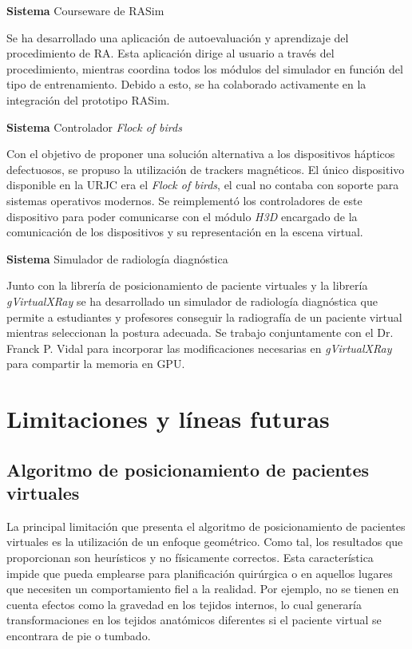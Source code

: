 \textbf{ Sistema } Courseware de \ac{RASim}

Se ha desarrollado una aplicación de autoevaluación y aprendizaje del procedimiento de \ac{RA}. Esta aplicación dirige al usuario a través del procedimiento, mientras coordina todos los módulos del simulador en función del tipo de entrenamiento. Debido a esto, se ha colaborado activamente en la integración del prototipo \ac{RASim}.

\textbf{ Sistema } Controlador \emph{Flock of birds} 

Con el objetivo de proponer una solución alternativa a los dispositivos hápticos defectuosos, se propuso la utilización de \acs{tracker}s magnéticos. El único dispositivo disponible en la \ac{URJC} era el \emph{Flock of birds}, el cual no contaba con soporte para sistemas operativos modernos. Se reimplementó los controladores de este dispositivo para poder comunicarse con el módulo \emph{H3D} encargado de la comunicación de los dispositivos y su representación en la escena virtual.


\textbf{ Sistema } Simulador de radiología diagnóstica

Junto con la librería de posicionamiento de paciente virtuales y la librería \emph{gVirtualXRay} se ha desarrollado un simulador de radiología diagnóstica que permite a estudiantes y profesores conseguir la radiografía de un paciente virtual mientras seleccionan la postura adecuada. Se trabajo conjuntamente con el Dr. Franck P. Vidal para incorporar las modificaciones necesarias en \emph{gVirtualXRay} para compartir la memoria en \acs{GPU}. 







\section{Limitaciones y líneas futuras}
\label{conclu:future}

\subsection{Algoritmo de posicionamiento de pacientes virtuales}

La principal limitación que presenta el algoritmo de posicionamiento de pacientes virtuales es la utilización de un enfoque geométrico. Como tal, los resultados que proporcionan son heurísticos y no físicamente correctos. Esta característica impide que pueda emplearse para planificación quirúrgica o en aquellos lugares que necesiten un comportamiento fiel a la realidad. Por ejemplo, no se tienen en cuenta efectos como la gravedad en los tejidos internos, lo cual generaría transformaciones en los tejidos anatómicos diferentes si el paciente virtual se encontrara de pie o tumbado.


